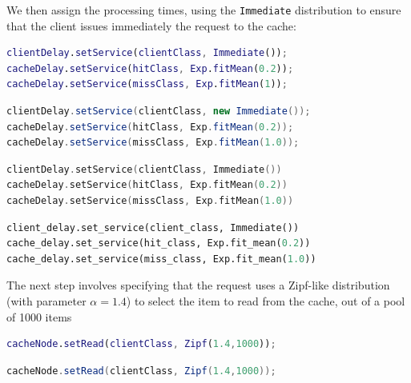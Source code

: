 We then assign the processing times, using the \texttt{Immediate} distribution to ensure that the client issues immediately the request to the cache:
\begin{MATLAB}
\begin{lstlisting}[language = matlab]
clientDelay.setService(clientClass, Immediate());
cacheDelay.setService(hitClass, Exp.fitMean(0.2));
cacheDelay.setService(missClass, Exp.fitMean(1));
\end{lstlisting}
\end{MATLAB}
\begin{JAVA}
\begin{lstlisting}[language = java, basicstyle=\ttfamily\scriptsize]
clientDelay.setService(clientClass, new Immediate());
cacheDelay.setService(hitClass, Exp.fitMean(0.2));
cacheDelay.setService(missClass, Exp.fitMean(1.0));
\end{lstlisting}        
\end{JAVA}
\begin{KOTLIN}
\begin{lstlisting}[language = kotlin, basicstyle=\ttfamily\scriptsize]
clientDelay.setService(clientClass, Immediate())
cacheDelay.setService(hitClass, Exp.fitMean(0.2))
cacheDelay.setService(missClass, Exp.fitMean(1.0))
\end{lstlisting}
\end{KOTLIN}
\begin{PYTHON}
\begin{lstlisting}[language = python]
client_delay.set_service(client_class, Immediate())
cache_delay.set_service(hit_class, Exp.fit_mean(0.2))
cache_delay.set_service(miss_class, Exp.fit_mean(1.0))
\end{lstlisting}
\end{PYTHON}
The next step involves specifying that the request uses a Zipf-like distribution (with parameter $\alpha=1.4$) to select the item to read from the cache, out of a pool of 1000 items
\begin{MATLAB}
\begin{lstlisting}[language = matlab]
cacheNode.setRead(clientClass, Zipf(1.4,1000));
\end{lstlisting}
\end{MATLAB}
\begin{JAVA}
\begin{lstlisting}[language = java, basicstyle=\ttfamily\scriptsize]
cacheNode.setRead(clientClass, Zipf(1.4,1000));
\end{lstlisting}
\end{JAVA}
